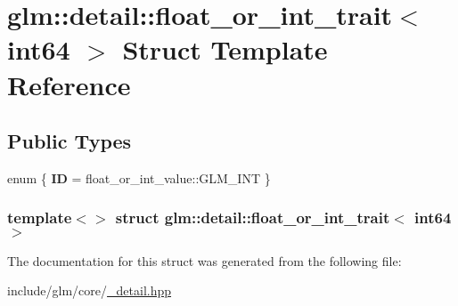 \hypertarget{structglm_1_1detail_1_1float__or__int__trait_3_01int64_01_4}{\section{glm\-:\-:detail\-:\-:float\-\_\-or\-\_\-int\-\_\-trait$<$ int64 $>$ \-Struct \-Template \-Reference}
\label{structglm_1_1detail_1_1float__or__int__trait_3_01int64_01_4}
}
\subsection*{\-Public \-Types}
\begin{DoxyCompactItemize}
\item 
enum \{ {\bfseries \-I\-D} =  float\-\_\-or\-\_\-int\-\_\-value\-:\-:\-G\-L\-M\-\_\-\-I\-N\-T
 \}
\end{DoxyCompactItemize}
\subsubsection*{template$<$$>$ struct glm\-::detail\-::float\-\_\-or\-\_\-int\-\_\-trait$<$ int64 $>$}



\-The documentation for this struct was generated from the following file\-:\begin{DoxyCompactItemize}
\item 
include/glm/core/\hyperlink{__detail_8hpp}{\-\_\-detail.\-hpp}\end{DoxyCompactItemize}
